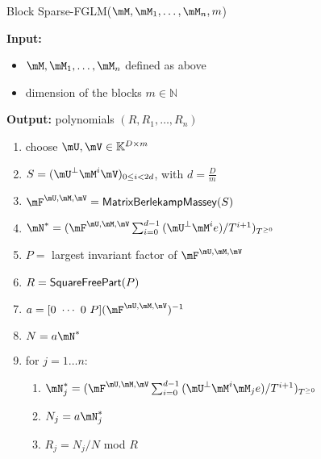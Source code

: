 \documentclass[12pt]{article}
\begin{document}
\begin{algorithm}[H]
	\caption{Block Sparse-FGLM($\mM,\mM_1,\dots,\mM_n,m$)}
	{\bf Input:} \vspace{-0.5em}
	\begin{itemize}
		\item $\mM,\mM_1,\dots,\mM_n$ defined as above
		\item dimension of the blocks $m \in \mathbb{N}$
	\end{itemize}
	{\bf Output:} polynomials $(R,R_1,\dots,R_n)$
  \begin{enumerate}[{\bf 1.}]
		\item {\sf choose $\mU,\mV \in \mathbb{K}^{D \times m}$}
		\item {\sf $S= (\mU^{\perp}\mM^i\mV)_{0 \le i < 2d}$, with $d = \frac{D}{m}$}
		\item {\sf $\mF^{\mU,\mM,\mV} = {\sf MatrixBerlekampMassey}(S)$}
		\item {\sf $\mN^* = (\mF^{\mU,\mM,\mV}\sum_{i=0}^{d-1} {(\mU^{\perp}\mM^ie)}/{T^{i+1}})_{T^{\ge 0}}$} 
		\item {\sf $P=$ largest invariant factor of $\mF^{\mU,\mM,\mV}$}
		\item {\sf $R={\sf SquareFreePart}(P)$} 
		\item {\sf $a = [0 ~\cdots~ 0 ~ P] (\mF^{\mU,\mM,\mV})^{-1}$}
		\item {\sf $N=a\mN^*$}
		\item {\sf for $j = 1 \dots n$:}
    \begin{enumerate}[{\bf 9.1.}]
			\item {\sf	$\mN_j^* = (\mF^{\mU,\mM,\mV}
				\sum_{i= 0}^{d-1} {(\mU^{\perp}\mM^i \mM_j e)}/{T^{i+1}})_{T^{\ge0}}$}
			\item {\sf $N_j=a\mN_j^*$}
			\item {\sf $R_j=N_j/N$ mod $R$}
		\end{enumerate}
	\end{enumerate}
	\label{algo:block-sparse-fglm}
\end{algorithm}
\end{document}
